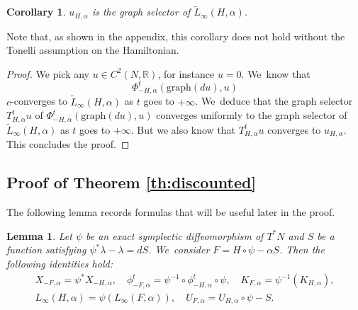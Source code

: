 \documentclass[10pt]{amsart}
\newtheorem{cor}[thm]{Corollary}
\newtheorem{lem}[thm]{Lemma}
\theoremstyle{definition}
\newcommand{\R}{\mathbb{R}}
\begin{document}
\begin{cor}\label{cor:KAMF-graph-selector}
$u_{H, \alpha}$ is the graph selector of $\tilde L_\infty(H, \alpha)$.
\end{cor}

Note that, as shown in the appendix, this corollary does not hold without the Tonelli assumption on the Hamiltonian.

\begin{proof}
We pick any $u\in C^2(N,\R)$, for instance $u=0$. We~know that\vspace*{-3pt}
\[
\Phi_{-H,\alpha}^t(\text{graph}(du), u)
\]
$c$-converges to $\tilde L_\infty(H, \alpha)$ as $t$ goes to $+\infty$. We~deduce that the graph selector $T^t_{H,\alpha}u$ of $\Phi_{-H,\alpha}^t(\text{graph}(du), u)$ converges uniformly to the graph selector of $\tilde L_\infty(H, \alpha)$ as $t$ goes to $+\infty$. But we also know that $T^t_{H,\alpha}u$ converges to $u_{H, \alpha}$. This concludes the proof.
\end{proof}

\subsection{Proof of Theorem \ref{th:discounted}}\label{sec:proof-discounted}

The following lemma records formulas that will be useful later in the proof.

\begin{lem}\label{lem:conjugacy-Hamiltonian-exact-symplectic}
Let $\psi$ be an exact symplectic diffeomorphism of $T^*N$ and $S$ be a function satisfying $\psi^*\lambda-\lambda=dS$. We~consider $F=H\circ \psi -\alpha S$. Then the following identities hold:\vspace*{-3pt}
\begin{gather*}
X_{-F,\alpha}=\psi^*X_{-H,\alpha}, \quad \phi^t_{-F,\alpha}=\psi^{-1}\circ \phi_{-H, \alpha}^t\circ \psi,\quad K_{F,\alpha}=\psi^{-1}(K_{H,\alpha}),\\
L_\infty(H, \alpha)=\psi(L_\infty(F, \alpha)),\quad U_{F, \alpha}=U_{H,\alpha}\circ \psi-S.
\end{gather*}
\end{lem}
\end{document}
